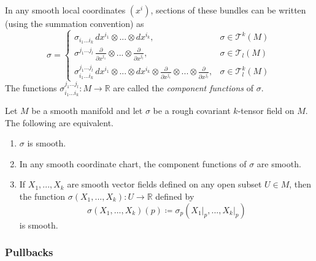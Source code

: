 \documentclass{article}
\begin{document}
    In any smooth local coordinates $(x^i)$, sections of these bundles can be written (using the summation convention) as
    \begin{equation}
      \sigma = \begin{cases}
                \sigma_{i_1 ... i_k} \, dx^{i_1} \otimes ... \otimes dx^{i_k}, & \sigma \in \mathcal{T}^k (M) \\
                \sigma^{j_1 ... j_l} \, \frac{\partial}{\partial x^{j_1}} \otimes ... \otimes \frac{\partial}{\partial x^{j_l}}, & \sigma \in \mathcal{T}_l (M) \\
                \sigma_{i_1 ... i_k}^{j_1 ... j_l} \, dx^{i_1} \otimes ... \otimes dx^{i_k} \otimes \frac{\partial}{\partial x^{j_1}} \otimes ... \otimes \frac{\partial}{\partial x^{j_l}}, & \sigma \in \mathcal{T}^k_l (M)
          \end{cases}
    \end{equation}
    The functions $\sigma_{i_1 ... i_k}^{j_1 ... j_l} : M \to \mathbb{R}$ are called the \textit{component functions} of $\sigma$. 

    \begin{lemma}
      \label{thm:smoothness-criteria-for-a-tensor-field}
    Let $M$ be a smooth manifold and let $\sigma$ be a rough covariant $k$-tensor field on $M$. The following are equivalent.
    \begin{enumerate}
        \item $\sigma$ is smooth. 
        \item In any smooth coordinate chart, the component functions of $\sigma$ are smooth. 
        \item If $X_1, ..., X_k$ are smooth vector fields defined on any open subset $U \in M$, then the function $\sigma(X_1, ..., X_k): U \to \mathbb{R}$ defined by 
        \begin{equation}
          \sigma(X_1, ..., X_k) (p) \coloneqq \sigma_p (X_1 \big|_p, ..., X_k \big|_p)
        \end{equation}
        is smooth. 
    \end{enumerate}
    \end{lemma}

    \subsubsection{Pullbacks}
\end{document}
